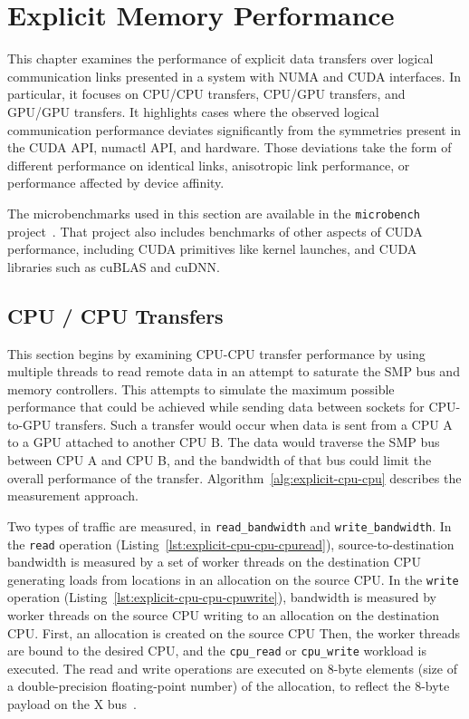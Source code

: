 \chapter{Explicit Memory Performance}
\label{ch:explicit}

This chapter examines the performance of explicit data transfers over logical communication links presented in a system with NUMA and CUDA interfaces.
In particular, it focuses on CPU/CPU transfers, CPU/GPU transfers, and GPU/GPU transfers.
It highlights cases where the observed logical communication performance deviates significantly from the symmetries present in the CUDA API, numactl API, and hardware.
Those deviations take the form of different performance on identical links, anisotropic link performance, or performance affected by device affinity.

The microbenchmarks used in this section are available in the \texttt{microbench} project~\cite{pearson2018microbench}.
That project also includes benchmarks of other aspects of CUDA performance, including CUDA primitives like kernel launches, and CUDA libraries such as cuBLAS and cuDNN.

\section{CPU / CPU Transfers}
\label{sec:explicit-cpu-cpu}

This section begins by examining CPU-CPU transfer performance by using multiple threads to read remote data in an attempt to saturate the SMP bus and memory controllers.
This attempts to simulate the maximum possible performance that could be achieved while sending data between sockets for CPU-to-GPU transfers.
Such a transfer would occur when data is sent from a CPU A to a GPU attached to another CPU B.
The data would traverse the SMP bus between CPU A and CPU B, and the bandwidth of that bus could limit the overall performance of the transfer.
Algorithm~\ref{alg:explicit-cpu-cpu} describes the measurement approach.

Two types of traffic are measured, in \texttt{read\_bandwidth} and \texttt{write\_bandwidth}.
In the \texttt{read} operation (Listing~\ref{lst:explicit-cpu-cpu-cpuread}), source-to-destination bandwidth is measured by a set of worker threads on the destination CPU generating loads from locations in an allocation on the source CPU.
In the \texttt{write} operation (Listing~\ref{lst:explicit-cpu-cpu-cpuwrite}), bandwidth is measured by worker threads on the source CPU writing to an allocation on the destination CPU.
First, an allocation is created on the source CPU
Then, the worker threads are bound to the desired CPU, and the \texttt{cpu\_read} or \texttt{cpu\_write} workload is executed.
The read and write operations are executed on 8-byte elements (size of a double-precision floating-point number) of the allocation, to reflect the 8-byte payload on the X bus~\cite{caldeira2016s822lc}.

